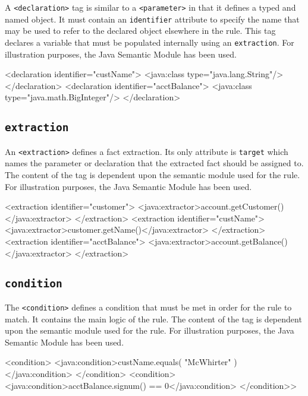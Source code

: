 A \verb|<declaration>| tag is similar to a \verb|<parameter>| in
that it defines a typed and named object.  It must contain an
\verb|identifier| attribute to specify the name that may be used
to refer to the declared object elsewhere in the rule.  This tag
declares a variable that must be populated internally using an
\verb|extraction|.  For illustration purposes, the Java Semantic
Module has been used.

\begin{codelisting}
<declaration identifier="custName">
\textcolor{light}{  <java:class type="java.lang.String"/>}
</declaration>
<declaration identifier="acctBalance">
\textcolor{light}{  <java:class type="java.math.BigInteger"/>}
</declaration>
\end{codelisting}

\subsection{\texttt{extraction}}

An \verb|<extraction>| defines a fact extraction.  Its only
attribute is \verb|target| which names the parameter or declaration
that the extracted fact should be assigned to.  The content
of the tag is dependent upon the semantic module used for the rule.
For illustration purposes, the Java Semantic Module has been used.

\begin{codelisting}
<extraction identifier="customer">
\textcolor{light}{  <java:extractor>account.getCustomer()</java:extractor>}
</extraction>
<extraction identifier="custName">
\textcolor{light}{  <java:extractor>customer.getName()</java:extractor>} 
</extraction>
<extraction identifier="acctBalance">
\textcolor{light}{  <java:extractor>account.getBalance()</java:extractor>}
</extraction>
\end{codelisting}

\subsection{\texttt{condition}}

The \verb|<condition>| defines a condition that must be met in
order for the rule to match. It contains the main logic of the rule.
The content of the tag is dependent upon the semantic module used for the rule.
For illustration purposes, the Java Semantic Module has been used.

\begin{codelisting}
<condition>
\textcolor{light}{  <java:condition>custName.equals( "McWhirter" )</java:condition>}
</condition>
<condition>
\textcolor{light}{  <java:condition>acctBalance.signum() == 0</java:condition>}
</condition>>
\end{codelisting}

